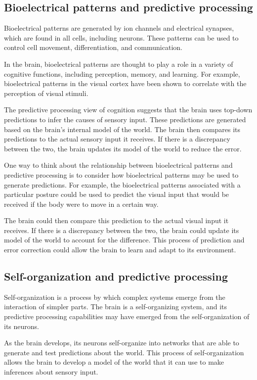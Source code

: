 \subsection{Bioelectrical patterns and predictive processing} 

Bioelectrical patterns are generated by ion channels and electrical synapses, which are found in all cells, including neurons. These patterns can be used to control cell movement, differentiation, and communication.

In the brain, bioelectrical patterns are thought to play a role in a variety of cognitive functions, including perception, memory, and learning. For example, bioelectrical patterns in the visual cortex have been shown to correlate with the perception of visual stimuli.

The predictive processing view of cognition suggests that the brain uses top-down predictions to infer the causes of sensory input. These predictions are generated based on the brain's internal model of the world. The brain then compares its predictions to the actual sensory input it receives. If there is a discrepancy between the two, the brain updates its model of the world to reduce the error.

One way to think about the relationship between bioelectrical patterns and predictive processing is to consider how bioelectrical patterns may be used to generate predictions. For example, the bioelectrical patterns associated with a particular posture could be used to predict the visual input that would be received if the body were to move in a certain way.

The brain could then compare this prediction to the actual visual input it receives. If there is a discrepancy between the two, the brain could update its model of the world to account for the difference. This process of prediction and error correction could allow the brain to learn and adapt to its environment.

\subsection{Self-organization and predictive processing} \cite{friston_world_2021}
Self-organization is a process by which complex systems emerge from the interaction of simpler parts. The brain is a self-organizing system, and its predictive processing capabilities may have emerged from the self-organization of its neurons.

As the brain develops, its neurons self-organize into networks that are able to generate and test predictions about the world. This process of self-organization allows the brain to develop a model of the world that it can use to make inferences about sensory input.

